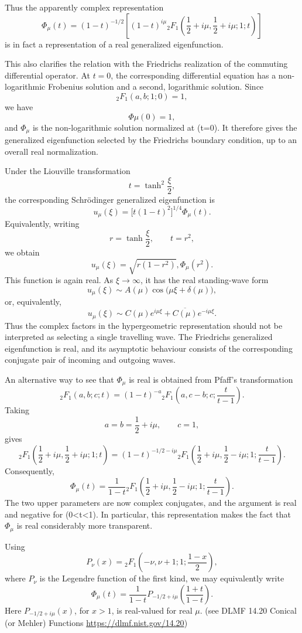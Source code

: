 \IfFileExists{iopjournal.cls}{\documentclass{iopjournal}}{\documentclass{iopjournal-draft}}
\theoremstyle{definition}
\theoremstyle{remark}
\numberwithin{equation}{section}
\begin{document}
Thus the apparently complex representation
\[
\Phi_\mu(t)
=(1-t)^{-1/2}
\left[
(1-t)^{i\mu}
{}_2F_1\left(
\frac12+i\mu,\frac12+i\mu;
1;t
\right)
\right]
\]
is in fact a representation of a real generalized eigenfunction.

This also clarifies the relation with the Friedrichs realization of the commuting differential operator. At \(t=0\), the corresponding differential equation has a non-logarithmic Frobenius solution and a second, logarithmic solution. Since
\[
{}_2F_1(a,b;1;0)=1,
\]
we have
\[
\Phi\mu(0)=1,
\]
and \(\Phi_\mu\) is the non-logarithmic solution normalized at (t=0). It therefore gives the generalized eigenfunction selected by the Friedrichs boundary condition, up to an overall real normalization.

Under the Liouville transformation
\[
t=\tanh^2\frac{\xi}{2},
\]
the corresponding Schrödinger generalized eigenfunction is
\[
u_\mu(\xi)
=
\bigl[t(1-t)^2\bigr]^{1/4}\Phi_\mu(t).
\]
Equivalently, writing
\[
r=\tanh\frac{\xi}{2},
\qquad t=r^2,
\]
we obtain
\[
u_\mu(\xi)
=	
\sqrt{r(1-r^2)},
\Phi_\mu(r^2).
\]
This function is again real. As \(\xi\to\infty\), it has the real standing-wave form
\[
u_\mu(\xi)
\sim
A(\mu)\cos\bigl(\mu\xi+\delta(\mu)\bigr),
\]
or, equivalently,
\[
u_\mu(\xi)
\sim
C(\mu)e^{i\mu\xi}
+
\overline{C(\mu)}e^{-i\mu\xi}.
\]
Thus the complex factors in the hypergeometric representation should not be interpreted as selecting a single travelling wave. The Friedrichs generalized eigenfunction is real, and its asymptotic behaviour consists of the corresponding conjugate pair of incoming and outgoing waves.



An alternative way to see that \(\Phi_\mu\) is real is obtained from Pfaff's transformation
\[
{}_2F_1(a,b;c;t)
=
(1-t)^{-a}
{}_2F_1\left(
a,c-b;c;\frac{t}{t-1}
\right).
\]
Taking
\[
a=b=\frac12+i\mu,\qquad c=1,
\]
gives
\[
{}_2F_1\left(
\frac12+i\mu,\frac12+i\mu;1;t
\right)
=
(1-t)^{-1/2-i\mu}
{}_2F_1\left(
\frac12+i\mu,\frac12-i\mu;
1;\frac{t}{t-1}
\right).
\]
Consequently,
\[
\Phi_\mu(t)
=
\frac{1}{1-t}
{}_2F_1\left(
\frac12+i\mu,\frac12-i\mu;
1;\frac{t}{t-1}
\right).
\]
The two upper parameters are now complex conjugates, and the argument is real and negative for (0<t<1). In particular, this representation makes the fact that  \(\Phi_\mu\) is real considerably more transparent.

Using
\[
P_\nu(x)
=
{}_2F_1\left(
-\nu,\nu+1;1;\frac{1-x}{2}
\right),
\]
where \(P_\nu\) is the Legendre function of the first kind, we may equivalently write
\[
\Phi_\mu(t)
=	
\frac{1}{1-t}
P_{-1/2+i\mu}\left(\frac{1+t}{1-t}\right).
\]
Here \(P_{-1/2+i\mu}(x)\), for \(x>1\),  is real-valued for real \(\mu\).  (see DLMF 14.20 Conical (or Mehler) Functions \url{https://dlmf.nist.gov/14.20})
\end{document}
